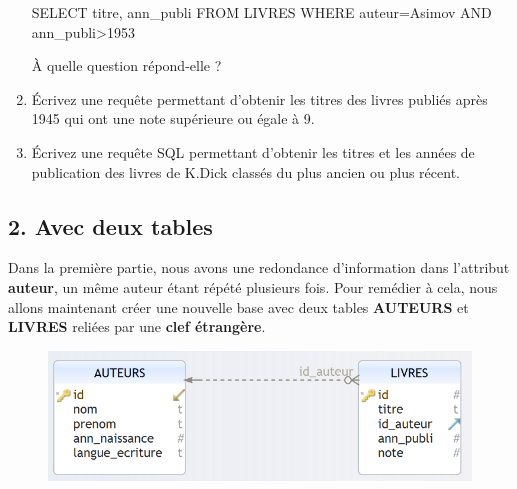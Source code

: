 \documentclass[
  a4paper,
  DIV=11,
  numbers=noendperiod]{scrartcl}
\newenvironment{Shaded}{\begin{snugshade}}{\end{snugshade}}
\newcommand{\DecValTok}[1]{\textcolor[rgb]{0.68,0.00,0.00}{#1}}
\newcommand{\KeywordTok}[1]{\textcolor[rgb]{0.00,0.23,0.31}{#1}}
\newcommand{\NormalTok}[1]{\textcolor[rgb]{0.00,0.23,0.31}{#1}}
\newcommand{\OperatorTok}[1]{\textcolor[rgb]{0.37,0.37,0.37}{#1}}
\newcommand{\StringTok}[1]{\textcolor[rgb]{0.13,0.47,0.30}{#1}}
\begin{document}
\begin{enumerate}
\begin{Shaded}
\begin{Highlighting}[]
\KeywordTok{SELECT}\NormalTok{ titre, ann\_publi}
\KeywordTok{FROM}\NormalTok{ LIVRES}
\KeywordTok{WHERE}\NormalTok{ auteur}\OperatorTok{=}\StringTok{\textquotesingle{}Asimov\textquotesingle{}} \KeywordTok{AND}\NormalTok{ ann\_publi}\OperatorTok{\textgreater{}}\DecValTok{1953}
\end{Highlighting}
\end{Shaded}

  À quelle question répond-elle ?
\item
  Écrivez une requête permettant d'obtenir les titres des livres publiés
  après 1945 qui ont une note supérieure ou égale à 9.
\item
  Écrivez une requête SQL permettant d'obtenir les titres et les années
  de publication des livres de K.Dick classés du plus ancien ou plus
  récent.
\end{enumerate}

\hypertarget{avec-deux-tables}{%
\subsection{2. Avec deux tables}\label{avec-deux-tables}}

Dans la première partie, nous avons une redondance d'information dans
l'attribut \textbf{auteur}, un même auteur étant répété plusieurs fois.
Pour remédier à cela, nous allons maintenant créer une nouvelle base
avec deux tables \textbf{AUTEURS} et \textbf{LIVRES} reliées par une
\textbf{clef étrangère}.

\begin{figure}

{\centering \includegraphics{TP1_8.png}

}

\end{figure}
\end{document}
